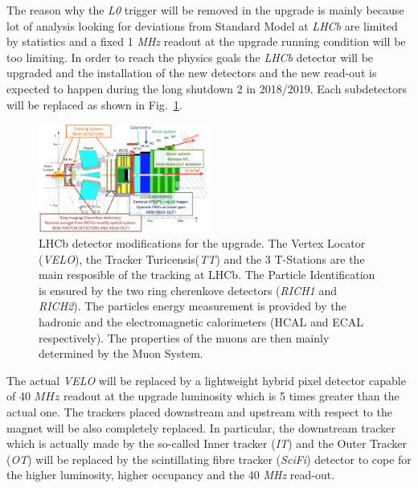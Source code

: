 \documentclass[paper=a4, fontsize=10pt]{scrartcl}
\numberwithin{equation}{section}		%
\numberwithin{figure}{section}			%
\numberwithin{table}{section}				%
\begin{document}
The reason why the \textit{L0} trigger will be removed in the upgrade is mainly because lot of analysis looking for deviations from Standard Model at \textit{LHCb} are limited by statistics and a fixed 1 \textit{MHz} readout at the upgrade running condition will be too limiting. 
In order to reach the physics goals the \textit{LHCb} detector will be upgraded and the installation of the new detectors and the new read-out is expected to happen during the long shutdown 2 in 2018/2019.
Each subdetectors will be replaced as shown in Fig.~\ref{Fig:Upgrade}.
\begin{figure}[h]
  \begin{center}
    \includegraphics[width=0.5\textwidth]{Images/Upgrade.png} 
  \caption[Caption for track type]{LHCb detector modifications for the upgrade. The Vertex Locator (\textit{VELO}), the Tracker Turicensis(\textit{TT}) and the 3 T-Stations are the main resposible of the tracking at LHCb. The Particle Identification is ensured by the two ring cherenkove detectors (\textit{RICH1} and \textit{RICH2}). The particles energy measurement is provided by the hadronic and the electromagnetic calorimeters (HCAL and ECAL respectively). The properties of the muons are then mainly determined by the Muon System.}\label{Fig:Upgrade}
  \end{center}
\end{figure}

The actual \textit{VELO} will be replaced by a lightweight hybrid pixel detector capable of 40 $MHz$ readout at the upgrade luminosity which is 5 times greater than the actual one.
The trackers placed downstream and upstream with respect to the magnet will be also completely replaced. In particular, the downstream tracker which is actually made by the so-called Inner tracker (\textit{IT}) and the Outer Tracker (\textit{OT}) will be replaced by the scintillating fibre tracker (\textit{SciFi}) detector to cope for the higher luminosity, higher occupancy and the 40 \textit{MHz} read-out.
\end{document}

